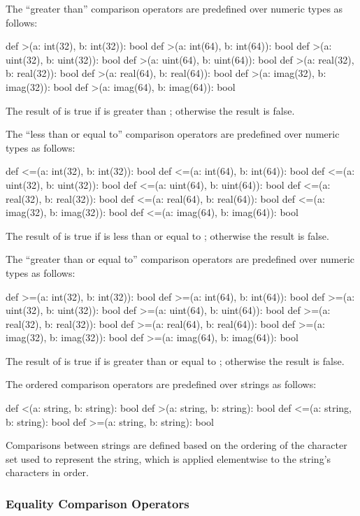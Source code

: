 The ``greater than'' comparison operators are predefined over numeric
types as follows:
\begin{chapel}
def >(a: int(32), b: int(32)): bool
def >(a: int(64), b: int(64)): bool
def >(a: uint(32), b: uint(32)): bool
def >(a: uint(64), b: uint(64)): bool
def >(a: real(32), b: real(32)): bool
def >(a: real(64), b: real(64)): bool
def >(a: imag(32), b: imag(32)): bool
def >(a: imag(64), b: imag(64)): bool
\end{chapel}
The result of  is true if  is greater
than ; otherwise the result is false.

The ``less than or equal to'' comparison operators are predefined over
numeric types as follows:
\begin{chapel}
def <=(a: int(32), b: int(32)): bool
def <=(a: int(64), b: int(64)): bool
def <=(a: uint(32), b: uint(32)): bool
def <=(a: uint(64), b: uint(64)): bool
def <=(a: real(32), b: real(32)): bool
def <=(a: real(64), b: real(64)): bool
def <=(a: imag(32), b: imag(32)): bool
def <=(a: imag(64), b: imag(64)): bool
\end{chapel}
The result of  is true if  is less than or equal
to ; otherwise the result is false.

The ``greater than or equal to'' comparison operators are predefined
over numeric types as follows:
\begin{chapel}
def >=(a: int(32), b: int(32)): bool
def >=(a: int(64), b: int(64)): bool
def >=(a: uint(32), b: uint(32)): bool
def >=(a: uint(64), b: uint(64)): bool
def >=(a: real(32), b: real(32)): bool
def >=(a: real(64), b: real(64)): bool
def >=(a: imag(32), b: imag(32)): bool
def >=(a: imag(64), b: imag(64)): bool
\end{chapel}
The result of  is true if  is greater than or
equal to ; otherwise the result is false.

The ordered comparison operators are predefined over strings as follows:
\begin{chapel}
def <(a: string, b: string): bool
def >(a: string, b: string): bool
def <=(a: string, b: string): bool
def >=(a: string, b: string): bool
\end{chapel}
Comparisons between strings are defined based on the ordering of the
character set used to represent the string, which is applied
elementwise to the string's characters in order.


\subsubsection{Equality Comparison Operators}
\label{Equality_Comparison_Operators}

